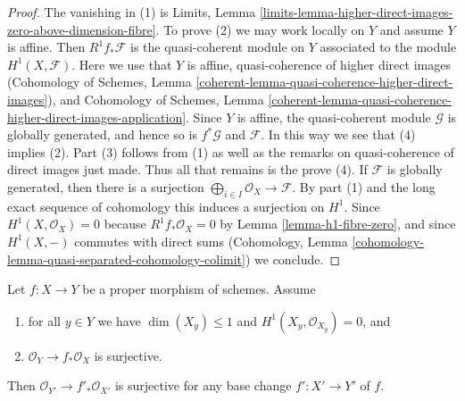 \begin{proof}
The vanishing in (1) is Limits, Lemma
\ref{limits-lemma-higher-direct-images-zero-above-dimension-fibre}.
To prove (2) we may work locally on $Y$ and assume $Y$ is affine.
Then $R^1f_*\mathcal{F}$ is the quasi-coherent module on $Y$
associated to the module $H^1(X, \mathcal{F})$.
Here we use that $Y$ is affine, quasi-coherence of higher direct
images (Cohomology of Schemes, Lemma
\ref{coherent-lemma-quasi-coherence-higher-direct-images}), and
Cohomology of Schemes, Lemma
\ref{coherent-lemma-quasi-coherence-higher-direct-images-application}.
Since $Y$ is affine, the quasi-coherent module $\mathcal{G}$
is globally generated, and hence so is $f^*\mathcal{G}$
and $\mathcal{F}$.
In this way we see that (4) implies (2).
Part (3) follows from (1) as well as the remarks on
quasi-coherence of direct images just made. Thus
all that remains is the prove (4).
If $\mathcal{F}$ is globally generated, then there is a surjection
$\bigoplus_{i \in I} \mathcal{O}_X \to \mathcal{F}$. By part (1)
and the long exact sequence of cohomology this
induces a surjection on $H^1$. Since $H^1(X, \mathcal{O}_X) = 0$
because $R^1f_*\mathcal{O}_X = 0$ by
Lemma \ref{lemma-h1-fibre-zero}, and
since $H^1(X, -)$ commutes with direct sums
(Cohomology, Lemma \ref{cohomology-lemma-quasi-separated-cohomology-colimit})
we conclude.
\end{proof}

\begin{lemma}
\label{lemma-h1-fibre-zero-check-h0-kappa}
Let $f : X \to Y$ be a proper morphism of schemes. Assume
\begin{enumerate}
\item for all $y \in Y$ we have $\dim(X_y) \leq 1$ and
$H^1(X_y, \mathcal{O}_{X_y}) = 0$, and
\item $\mathcal{O}_Y \to f_*\mathcal{O}_X$ is surjective.
\end{enumerate}
Then $\mathcal{O}_{Y'} \to f'_*\mathcal{O}_{X'}$ is surjective
for any base change $f' : X' \to Y'$ of $f$.
\end{lemma}

